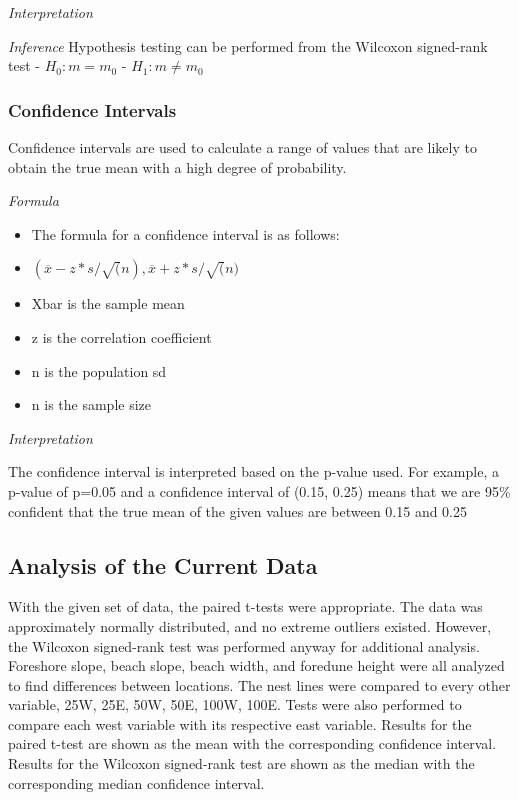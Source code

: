 \documentclass[
]{article}
\providecommand{\tightlist}{%
  \setlength{\itemsep}{0pt}\setlength{\parskip}{0pt}}
\begin{document}
\emph{Interpretation}

\emph{Inference}
Hypothesis testing can be performed from the Wilcoxon signed-rank test
- \(H_{0}: m = m_{0}\)
- \(H_{1}: m\ne m_{0}\)

\hypertarget{confidence-intervals}{%
\subsubsection{Confidence Intervals}\label{confidence-intervals}}

Confidence intervals are used to calculate a range of values that are likely to obtain the true mean with a high degree of probability.

\emph{Formula}

\begin{itemize}
\tightlist
\item
  The formula for a confidence interval is as follows:
\item
  \((\overline{x} - z*s/\sqrt(n), \overline{x} + z*s/\sqrt(n)\)
\item
  Xbar is the sample mean
\item
  z is the correlation coefficient
\item
  n is the population sd
\item
  n is the sample size
\end{itemize}

\emph{Interpretation}

The confidence interval is interpreted based on the p-value used. For example, a p-value of p=0.05 and a confidence interval of (0.15, 0.25) means that we are 95\% confident that the true mean of the given values are between 0.15 and 0.25

\hypertarget{analysis-of-the-current-data}{%
\subsection{Analysis of the Current Data}\label{analysis-of-the-current-data}}

With the given set of data, the paired t-tests were appropriate. The data was approximately normally distributed, and no extreme outliers existed. However, the Wilcoxon signed-rank test was performed anyway for additional analysis. Foreshore slope, beach slope, beach width, and foredune height were all analyzed to find differences between locations. The nest lines were compared to every other variable, 25W, 25E, 50W, 50E, 100W, 100E. Tests were also performed to compare each west variable with its respective east variable. Results for the paired t-test are shown as the mean with the corresponding confidence interval. Results for the Wilcoxon signed-rank test are shown as the median with the corresponding median confidence interval.
\end{document}
